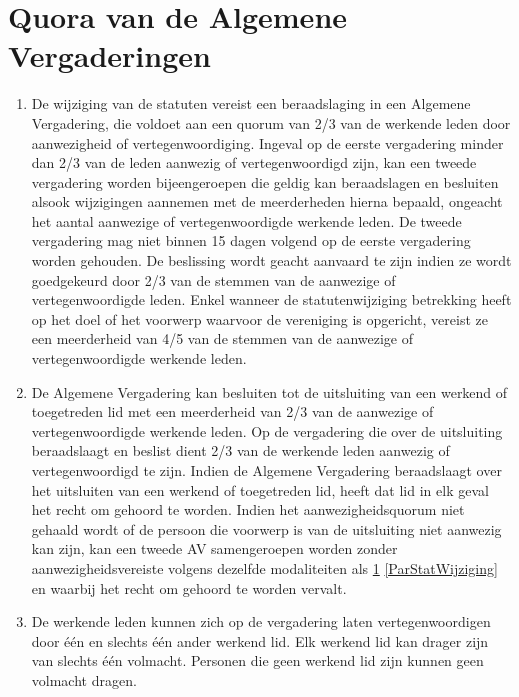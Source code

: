    \section{Quora van de Algemene Vergaderingen}\label{ArtikelQuoraAV}
    \begin{enumerate}
    \item De wijziging van de statuten vereist een beraadslaging in een Algemene Vergadering, die voldoet aan een quorum van 2/3 van de werkende leden door aanwezigheid of vertegenwoordiging. Ingeval op de eerste vergadering minder dan 2/3 van de leden aanwezig of vertegenwoordigd zijn, kan een tweede vergadering worden bijeengeroepen die geldig kan beraadslagen en besluiten alsook wijzigingen aannemen met de meerderheden hierna bepaald, ongeacht het aantal aanwezige of vertegenwoordigde werkende leden. De tweede vergadering mag niet binnen 15 dagen volgend op de eerste vergadering worden gehouden. De beslissing wordt geacht aanvaard te zijn indien ze wordt goedgekeurd door 2/3 van de stemmen van de aanwezige of vertegenwoordigde leden. Enkel wanneer de statutenwijziging betrekking heeft op het doel of het voorwerp waarvoor de vereniging is opgericht, vereist ze een meerderheid van 4/5 van de stemmen van de aanwezige of vertegenwoordigde werkende leden. \label{ParStatWijziging}
    \item De Algemene Vergadering kan besluiten tot de uitsluiting van een werkend of toegetreden lid met een meerderheid van 2/3 van de aanwezige of vertegenwoordigde werkende leden. Op de vergadering die over de uitsluiting beraadslaagt en beslist dient 2/3 van de werkende leden aanwezig of vertegenwoordigd te zijn. Indien de Algemene Vergadering beraadslaagt over het uitsluiten van een werkend of toegetreden lid, heeft dat lid in elk geval het recht om gehoord te worden. Indien het aanwezigheidsquorum niet gehaald wordt of de persoon die voorwerp is van de uitsluiting niet aanwezig kan zijn, kan een tweede AV samengeroepen worden zonder aanwezigheidsvereiste volgens dezelfde modaliteiten als \ref{ArtikelQuoraAV} \ref{ParStatWijziging} en waarbij het recht om gehoord te worden vervalt.
    \label{ParUitsluitingLid}
    \item De werkende leden kunnen zich op de vergadering laten vertegenwoordigen door één en slechts één ander werkend lid. Elk werkend lid kan drager zijn van slechts één volmacht. Personen die geen werkend lid zijn kunnen geen volmacht dragen.
    \end{enumerate}
    
